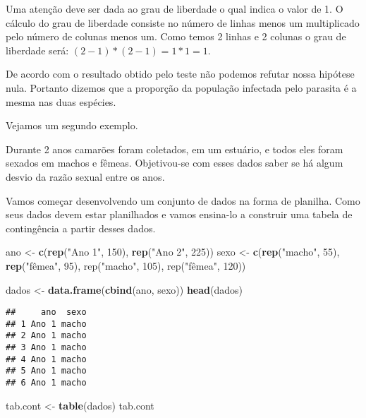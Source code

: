 \documentclass[titlepage, oneside, openany, a4paper]{book}
\newenvironment{Shaded}{\begin{snugshade}}{\end{snugshade}}
\newcommand{\DecValTok}[1]{\textcolor[rgb]{0.00,0.00,0.81}{#1}}
\newcommand{\KeywordTok}[1]{\textcolor[rgb]{0.13,0.29,0.53}{\textbf{#1}}}
\newcommand{\NormalTok}[1]{#1}
\newcommand{\StringTok}[1]{\textcolor[rgb]{0.31,0.60,0.02}{#1}}
\begin{document}
Uma atenção deve ser dada ao grau de liberdade o qual indica o valor de 1. O cálculo do grau de liberdade consiste no número de linhas menos um multiplicado pelo número de colunas menos um. Como temos 2 linhas e 2 colunas o grau de liberdade será: \((2-1)*(2-1) = 1*1 = 1\).

De acordo com o resultado obtido pelo teste não podemos refutar nossa hipótese nula. Portanto dizemos que a proporção da população infectada pelo parasita é a mesma nas duas espécies.

Vejamos um segundo exemplo.

Durante 2 anos camarões foram coletados, em um estuário, e todos eles foram sexados em machos e fêmeas. Objetivou-se com esses dados saber se há algum desvio da razão sexual entre os anos.

Vamos começar desenvolvendo um conjunto de dados na forma de planilha. Como seus dados devem estar planilhados e vamos ensina-lo a construir uma tabela de contingência a partir desses dados.

\begin{Shaded}
\begin{Highlighting}[]
\NormalTok{ano <-}\StringTok{ }\KeywordTok{c}\NormalTok{(}\KeywordTok{rep}\NormalTok{(}\StringTok{"Ano 1"}\NormalTok{, }\DecValTok{150}\NormalTok{), }\KeywordTok{rep}\NormalTok{(}\StringTok{"Ano 2"}\NormalTok{, }\DecValTok{225}\NormalTok{))}
\NormalTok{sexo <-}\StringTok{ }\KeywordTok{c}\NormalTok{(}\KeywordTok{rep}\NormalTok{(}\StringTok{"macho"}\NormalTok{, }\DecValTok{55}\NormalTok{), }\KeywordTok{rep}\NormalTok{(}\StringTok{"fêmea", 95), rep("}\NormalTok{macho}\StringTok{", 105), rep("}\NormalTok{fêmea", }\DecValTok{120}\NormalTok{))}

\NormalTok{dados <-}\StringTok{ }\KeywordTok{data.frame}\NormalTok{(}\KeywordTok{cbind}\NormalTok{(ano, sexo))}
\KeywordTok{head}\NormalTok{(dados)}
\end{Highlighting}
\end{Shaded}

\begin{verbatim}
##     ano  sexo
## 1 Ano 1 macho
## 2 Ano 1 macho
## 3 Ano 1 macho
## 4 Ano 1 macho
## 5 Ano 1 macho
## 6 Ano 1 macho
\end{verbatim}

\begin{Shaded}
\begin{Highlighting}[]
\NormalTok{tab.cont <-}\StringTok{ }\KeywordTok{table}\NormalTok{(dados)}
\NormalTok{tab.cont}
\end{Highlighting}
\end{Shaded}
\end{document}
